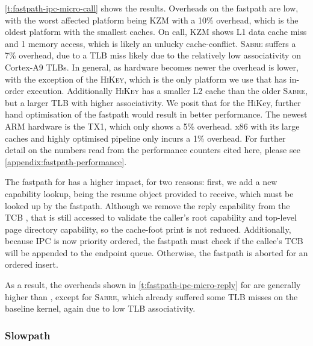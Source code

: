 \cref{t:fastpath-ipc-micro-call} shows the results.
Overheads on the \call fastpath are low, with the worst affected platform being
\textsc{KZM} with a 10\% overhead, which is the oldest platform with the smallest caches. On call,
\textsc{KZM} shows L1 data cache miss and 1 memory access, which is likely an unlucky cache-conflict. \textsc{Sabre} suffers a 7\% overhead, due to a \gls{TLB} miss likely
due to the relatively low associativity on Cortex-A9 \glspl{TLB}.  In general, as hardware becomes newer the
overhead is lower, with the exception of the \textsc{HiKey}, which is the only platform we use that has 
in-order execution. Additionally \textsc{HiKey} has a smaller L2 cache than the older \textsc{Sabre},
but a larger \gls{TLB} with higher associativity.
We posit that for the HiKey, further hand optimisation of the fastpath would result in better
performance. The newest ARM hardware is the TX1, which only shows a 5\% overhead. x86 with its large
caches and highly optimised pipeline only incurs a 1\% overhead. For further detail on the
numbers read from the performance counters cited here, please see
\cref{appendix:fastpath-performance}.

The fastpath for \replyrecv has a higher impact, for two reasons: first, we add a new capability
lookup, being the resume object provided to receive, which must be looked up by the \replyrecv
fastpath. Although we remove the reply capability from the \gls{TCB}
\cnode, that \cnode is still accessed to validate the caller's root \cnode capability
and top-level page directory capability, so the cache-foot print is not reduced. Additionally, because
\gls{IPC} is now priority ordered, the fastpath must check if the callee's \gls{TCB} will be appended to the
endpoint queue. Otherwise, the fastpath is aborted for an ordered insert. 

As a result, the overheads shown in \cref{t:fastpath-ipc-micro-reply} for \replyrecv are generally higher
than \call, except for \textsc{Sabre}, which already suffered some \gls{TLB} misses on
the baseline kernel, again due to low \gls{TLB} associativity.
\clearpage

\subsubsection{Slowpath}
\label{eval:slowpath}

